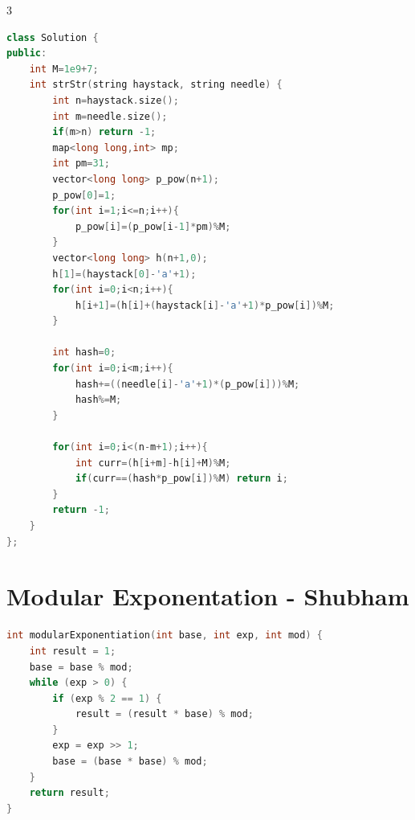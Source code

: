 \documentclass[10pt,landscape, a4paper]{article}
\begin{document}
\begin{multicols*}{3}
\begin{lstlisting}[language=C++]
class Solution {
public:
    int M=1e9+7;
    int strStr(string haystack, string needle) {
        int n=haystack.size();
        int m=needle.size();
        if(m>n) return -1;
        map<long long,int> mp;
        int pm=31;
        vector<long long> p_pow(n+1);
        p_pow[0]=1;
        for(int i=1;i<=n;i++){
            p_pow[i]=(p_pow[i-1]*pm)%M;            
        }
        vector<long long> h(n+1,0);
        h[1]=(haystack[0]-'a'+1);
        for(int i=0;i<n;i++){
            h[i+1]=(h[i]+(haystack[i]-'a'+1)*p_pow[i])%M;
        }

        int hash=0;
        for(int i=0;i<m;i++){
            hash+=((needle[i]-'a'+1)*(p_pow[i]))%M;
            hash%=M;
        }

        for(int i=0;i<(n-m+1);i++){
            int curr=(h[i+m]-h[i]+M)%M;
            if(curr==(hash*p_pow[i])%M) return i;
        }
        return -1;
    }
}; 
\end{lstlisting}

\section{Modular Exponentation - Shubham}
\begin{lstlisting}[language=C++]
int modularExponentiation(int base, int exp, int mod) {
    int result = 1;
    base = base % mod;
    while (exp > 0) {
        if (exp % 2 == 1) {
            result = (result * base) % mod;
        }
        exp = exp >> 1;
        base = (base * base) % mod;
    }
    return result;
}
\end{lstlisting}


\end{multicols*}
\end{document}
